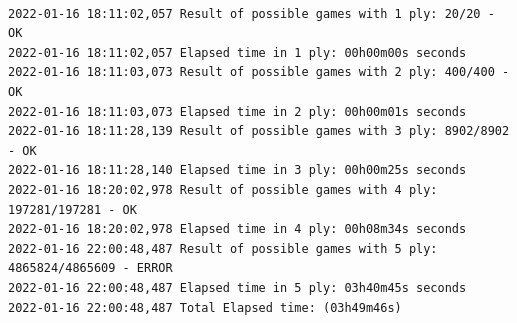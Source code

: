 \documentclass[10pt]{article}
\begin{document}
\begin{lstlisting}

2022-01-16 18:11:02,057 Result of possible games with 1 ply: 20/20 - OK
2022-01-16 18:11:02,057 Elapsed time in 1 ply: 00h00m00s seconds
2022-01-16 18:11:03,073 Result of possible games with 2 ply: 400/400 - OK
2022-01-16 18:11:03,073 Elapsed time in 2 ply: 00h00m01s seconds
2022-01-16 18:11:28,139 Result of possible games with 3 ply: 8902/8902 - OK
2022-01-16 18:11:28,140 Elapsed time in 3 ply: 00h00m25s seconds
2022-01-16 18:20:02,978 Result of possible games with 4 ply: 197281/197281 - OK
2022-01-16 18:20:02,978 Elapsed time in 4 ply: 00h08m34s seconds
2022-01-16 22:00:48,487 Result of possible games with 5 ply: 4865824/4865609 - ERROR
2022-01-16 22:00:48,487 Elapsed time in 5 ply: 03h40m45s seconds
2022-01-16 22:00:48,487 Total Elapsed time: (03h49m46s)
    
\end{lstlisting}
\end{document}
